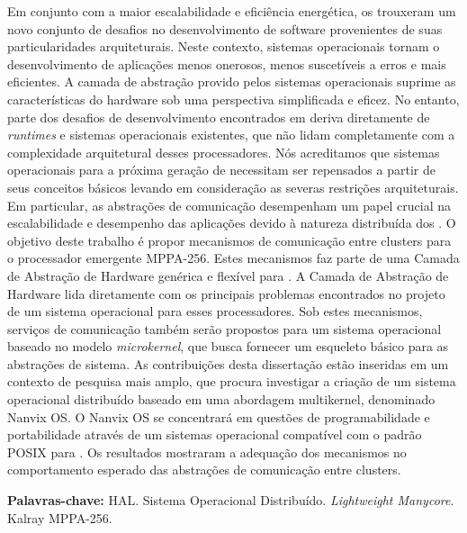 
\begin{resumo}[Resumo]
	Em conjunto com a maior escalabilidade e eficiência energética, os
	\lightweight \manycores trouxeram um novo conjunto de desafios no
	desenvolvimento de software provenientes de suas particularidades
	arquiteturais. Neste contexto, sistemas operacionais tornam o
	desenvolvimento de aplicações menos onerosos, menos suscetíveis a
	erros e mais eficientes. A camada de abstração provido pelos
	sistemas operacionais suprime as características do hardware sob
	uma perspectiva simplificada e eficez. No entanto, parte dos desafios
	de desenvolvimento encontrados em \lightweight \manycores deriva
	diretamente de \textit{runtimes} e sistemas operacionais existentes,
	que não lidam completamente com a complexidade arquitetural desses
	processadores. Nós acreditamos que sistemas operacionais para a
	próxima geração de \lightweight \manycores necessitam ser repensados
	a partir de seus conceitos básicos levando em consideração as severas
	restrições arquiteturais. Em particular, as abstrações de comunicação
	desempenham um papel crucial na escalabilidade e desempenho das
	aplicações devido à natureza distribuída dos \manycores. O objetivo
	deste trabalho é propor mecanismos de comunicação entre clusters
	para o processador \manycore emergente MPPA-256. Estes mecanismos
	faz parte de uma Camada de Abstração de Hardware genérica e flexível
	para \lightweight \manycores. A Camada de Abstração de Hardware lida
	diretamente com os principais problemas encontrados no projeto de um
	sistema operacional para esses processadores. Sob estes mecanismos,
	serviços de comunicação também serão propostos para um sistema
	operacional baseado no modelo \textit{microkernel}, que busca fornecer
	um esqueleto básico para as abstrações de sistema. As contribuições
	desta dissertação estão inseridas em um contexto de pesquisa mais
	amplo, que procura investigar a criação de um sistema operacional
	distribuído baseado em uma abordagem multikernel, denominado Nanvix OS.
	O Nanvix OS se concentrará em questões de programabilidade e
	portabilidade através de um sistemas operacional compatível com o
	padrão POSIX para \lightweight \manycore. Os resultados mostraram
	a adequação dos mecanismos no comportamento esperado das abstrações
	de comunicação entre clusters.

	\vspace{\baselineskip}
	\textbf{Palavras-chave:} HAL. Sistema Operacional Distribuído. \textit{Lightweight Manycore}. Kalray MPPA-256.
\end{resumo}


